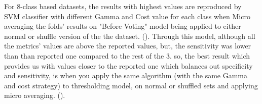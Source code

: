         For 8-class based datasets, the results with highest values are reproduced by SVM classifier with different Gamma and Cost 
        value for each class when Micro averaging the folds' results on 
        "Before Voting" model being applied to either normal or shuffle version of the the dataset.
        (). Through this model, although all the metrics' 
        values are above the reported values, but, the sensitivity was lower than than reported one compared to the rest of the 3.
        so, the best result which provides us with values closer to the reported one which balances out specificity and sensitivity, 
        is when you apply the same algorithm (with the same Gamma and cost strategy) to thresholding model, on normal or shuffled sets 
        and applying micro averaging. ().\\

